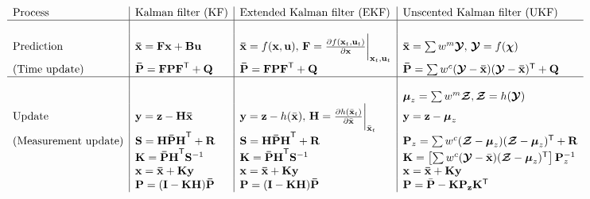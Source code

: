 \documentclass[border=0.2cm]{standalone}
\begin{document}
\color{black}
$\begin{array}{l|l|l|l}
\text{Process}                      &
\text{Kalman filter (KF)}           & 
\text{Extended Kalman filter (EKF)} & 
\text{Unscented Kalman filter (UKF)} \\

\hline 
& & & \\

\text{Prediction} &
\mathbf{\bar x} = \mathbf{Fx} + \mathbf{Bu} & 
\mathbf{\bar x} = f(\mathbf x, \mathbf u),\, \mathbf F = {\frac{\partial{f(\mathbf x_t, \mathbf u_t)}}{\partial{\mathbf x}}}\biggr|_{{\mathbf x_t},{\mathbf u_t}} & 
\mathbf{\bar x} = \sum w^m\boldsymbol{\mathcal Y},\, \boldsymbol{\mathcal Y} = f(\boldsymbol\chi) \\

\text{(Time update)} &
\mathbf{\bar P} = \mathbf{FPF}^\mathsf{T}+\mathbf Q  & 
\mathbf{\bar P} = \mathbf{FPF}^\mathsf{T}+\mathbf Q  &
\mathbf{\bar P} = \sum w^c(\boldsymbol{\mathcal Y} - \mathbf{\bar x})(\boldsymbol{\mathcal Y} - \mathbf{\bar x})^\mathsf T+\mathbf Q \\

\hline
& & & \\

& & & \boldsymbol\mu_z = \sum w^m\boldsymbol{\mathcal{Z}}, \boldsymbol{\mathcal Z} =  h(\boldsymbol{\mathcal{Y}}) \\

\text{Update} &
\textbf{y} = \mathbf z - \mathbf{H \bar{x}} & 
\textbf{y} = \mathbf z - h(\bar{\mathbf x}),\, \mathbf H = \frac{\partial{h(\bar{\mathbf x}_t)}}{\partial{\bar{\mathbf x}}}\biggr|_{\bar{\mathbf x}_t} &
\mathbf y = \mathbf z - \boldsymbol\mu_z \\

\text{(Measurement update)} &
\mathbf S = \mathbf{H\bar PH}^\mathsf{T} + \mathbf R & 
\mathbf S = \mathbf{H\bar PH}^\mathsf{T} + \mathbf R & 
\mathbf P_z = \sum w^c{(\boldsymbol{\mathcal Z}-\boldsymbol\mu_z)(\boldsymbol{\mathcal{Z}}-\boldsymbol\mu_z)^\mathsf{T}} + \mathbf R \\

& 
\mathbf K = \mathbf{\bar PH}^\mathsf T \mathbf S^{-1} & 
\mathbf K = \mathbf{\bar PH}^\mathsf T \mathbf S^{-1} &
\mathbf K = \left[\sum w^c(\boldsymbol{\mathcal Y}-\bar{\mathbf x})(\boldsymbol{\mathcal{Z}}-\boldsymbol\mu_z)^\mathsf{T}\right] \mathbf P_z^{-1} \\

&
\mathbf x = \mathbf{\bar x} + \mathbf{Ky} & 
\mathbf x = \mathbf{\bar x} + \mathbf{Ky} &
\mathbf x = \mathbf{\bar x} + \mathbf{Ky} \\

&
\mathbf P = (\mathbf{I}-\mathbf{KH})\mathbf{\bar{P}} & 
\mathbf P = (\mathbf{I}-\mathbf{KH})\mathbf{\bar{P}} &
\mathbf P = \bar{\mathbf P} - \mathbf{KP_z}\mathbf{K}^\mathsf{T}
\end{array}$
\end{document}
